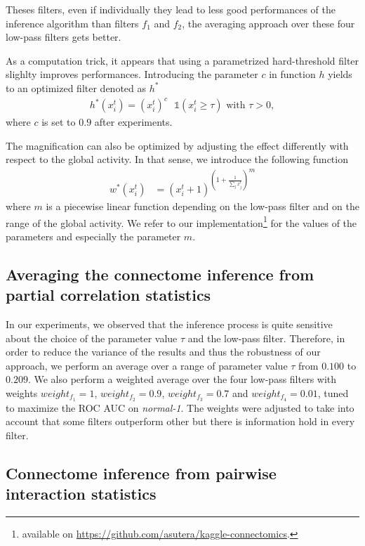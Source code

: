 \documentclass[wcp]{jmlr}
\begin{document}
Theses filters, even if individually they lead to less good performances of the inference algorithm than filters $f_1$ and
$f_2$, the averaging approach over these four low-pass
filters gets better.

As a computation trick, it appears that using a parametrized hard-threshold filter slighlty improves performances. Introducing the parameter $c$ in function $h$ yields to an optimized filter denoted as $h^*$
\begin{align}
h^*(x^t_i) = (x_i^t)^c \text{ } \mathbb{1}(x_i^t \ge \tau) \text{ with } \tau > 0,
\end{align}
where $c$ is set to $0.9$ after experiments.

The magnification can also be optimized by adjusting the effect differently with respect to the global activity. In that sense, we introduce the following function
\begin{align}
 w^*(x^{t}_i) &= {(x^{t}_i + 1 )^{\left (1 + \frac{1}{\sum_{j} x^{t}_j}\right )}}^{m}
\end{align}
where $m$ is a piecewise linear function depending on the low-pass filter and on the range of the global activity. We refer to our implementation\footnote{available on \url{https://github.com/asutera/kaggle-connectomics}.} for the values of the parameters and especially the parameter $m$.

\subsection*{Averaging the connectome inference from partial correlation statistics}

In our experiments, we observed that the inference process is quite sensitive about the choice of the parameter value $\tau$ and the low-pass filter. Therefore, in order to reduce the variance of the results and thus the robustness of our approach, we perform an average over a range of parameter value $\tau$ from $0.100$ to $0.209$. We also perform a weighted average over the four low-pass filters with weights 
$weight_{f_1} = 1$, $weight_{f_2} = 0.9$, $weight_{f_3} = 0.7$ and $weight_{f_4} = 0.01$, tuned to maximize the ROC AUC on \textit{normal-1}.
The weights were adjusted to take into account that some filters outperform other but there is information hold in every filter.



\subsection*{Connectome inference from pairwise interaction statistics}
\end{document}
